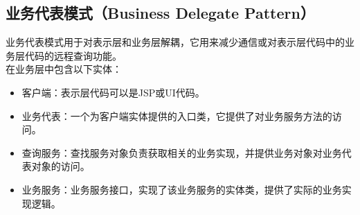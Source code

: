 \subsection{业务代表模式（Business Delegate Pattern）}

业务代表模式用于对表示层和业务层解耦，它用来减少通信或对表示层代码中的业务层代码的远程查询功能。\\

在业务层中包含以下实体：

\begin{itemize}
    \item 客户端：表示层代码可以是JSP或UI代码。

    \item 业务代表：一个为客户端实体提供的入口类，它提供了对业务服务方法的访问。

    \item 查询服务：查找服务对象负责获取相关的业务实现，并提供业务对象对业务代表对象的访问。

    \item 业务服务：业务服务接口，实现了该业务服务的实体类，提供了实际的业务实现逻辑。
\end{itemize}

\vspace{0.5cm}

\\

